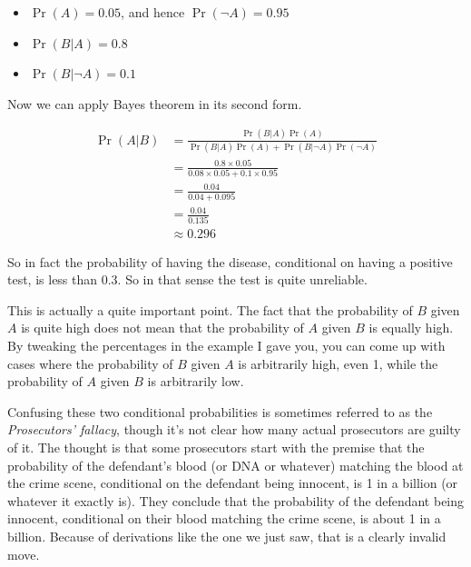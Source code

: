 \documentclass[
  11pt,
  letterpaper,
]{scrbook}
\providecommand{\tightlist}{%
  \setlength{\itemsep}{0pt}\setlength{\parskip}{0pt}}
\begin{document}
\begin{itemize}
\tightlist
\item
  \(\Pr(A) = 0.05\), and hence \(\Pr(\neg A) = 0.95\)
\item
  \(\Pr(B | A) = 0.8\)
\item
  \(\Pr(B | \neg A) = 0.1\)
\end{itemize}

Now we can apply Bayes theorem in its second form.

\begin{align*}
\Pr(A|B) &= \frac{\Pr(B|A) \Pr(A)}{\Pr(B|A)\Pr(A) + \Pr(B|\neg A)\Pr(\neg A)} \\
&= \frac{0.8 \times 0.05}{0.08 \times 0.05 + 0.1 \times 0.95} \\
&= \frac{0.04}{0.04 + 0.095} \\
&= \frac{0.04}{0.135} \\
&\approx 0.296
\end{align*}

So in fact the probability of having the disease, conditional on having
a positive test, is less than 0.3. So in that sense the test is quite
unreliable.

This is actually a quite important point. The fact that the probability
of \(B\) given \(A\) is quite high does not mean that the probability of
\(A\) given \(B\) is equally high. By tweaking the percentages in the
example I gave you, you can come up with cases where the probability of
\(B\) given \(A\) is arbitrarily high, even 1, while the probability of
\(A\) given \(B\) is arbitrarily low.

Confusing these two conditional probabilities is sometimes referred to
as the \emph{Prosecutors' fallacy}, though it's not clear how many
actual prosecutors are guilty of it. The thought is that some
prosecutors start with the premise that the probability of the
defendant's blood (or DNA or whatever) matching the blood at the crime
scene, conditional on the defendant being innocent, is 1 in a billion
(or whatever it exactly is). They conclude that the probability of the
defendant being innocent, conditional on their blood matching the crime
scene, is about 1 in a billion. Because of derivations like the one we
just saw, that is a clearly invalid move.
\end{document}
